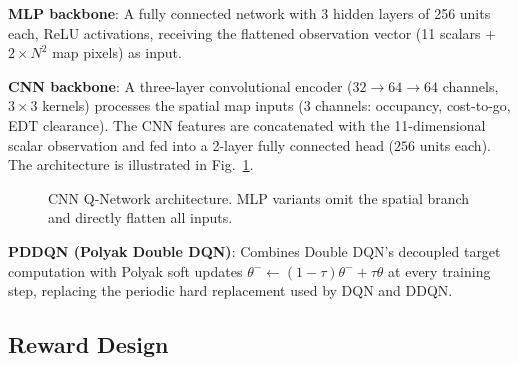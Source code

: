 \documentclass[conference]{IEEEtran}
\begin{document}
\textbf{MLP backbone}: A fully connected network with 3 hidden layers of 256 units each, ReLU activations, receiving the flattened observation vector (11 scalars + $2 \times N^2$ map pixels) as input.

\textbf{CNN backbone}: A three-layer convolutional encoder ($32 \to 64 \to 64$ channels, $3{\times}3$ kernels) processes the spatial map inputs (3 channels: occupancy, cost-to-go, EDT clearance).
The CNN features are concatenated with the 11-dimensional scalar observation and fed into a 2-layer fully connected head ($256$ units each).
The architecture is illustrated in Fig.~\ref{fig:architecture}.

\begin{figure}[t]
\centering
{}
\caption{CNN Q-Network architecture. MLP variants omit the spatial branch and directly flatten all inputs.}
\label{fig:architecture}
\end{figure}

\textbf{PDDQN (Polyak Double DQN)}: Combines Double DQN's decoupled target computation with Polyak soft updates $\theta^- \leftarrow (1-\tau)\theta^- + \tau\theta$ at every training step, replacing the periodic hard replacement used by DQN and DDQN.

\subsection{Reward Design}\label{sec:reward}
\end{document}
